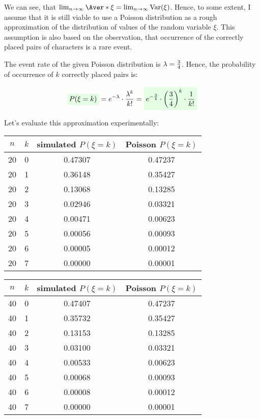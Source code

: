 \documentclass{article}
\newcommand{\highlight}[1]{\colorbox{green!10}{$\displaystyle#1$}}
\newcommand{\Var}{\mathrm{Var}}
\begin{document}
We can see, that $\lim_{n\to\infty} \Aver*{\xi} = \lim_{n\to\infty} \Var(\xi)$. Hence, to some extent, I assume that it is still viable to use a Poisson distribution as a rough approximation of the distribution of values of the random variable $\xi$. This assumption is also based on the observation, that occurrence of the correctly placed pairs of characters is a rare event.

The event rate of the given Poisson distribution is $\lambda = {3 \over 4}$. Hence, the probability of occurrence of $k$ correctly placed pairs is:

\begin{equation}
\highlight{P(\xi = k)} = e^{-\lambda} \cdot {\lambda^k \over k!} = \highlight{e^{-{3 \over 4}} \cdot \left({3 \over 4}\right)^k \cdot {1 \over k!}}
\end{equation}

Let's evaluate this approximation experimentally: \\

\begin{tabular}{| c | c | c | c |}
\hline
$n$ & $k$ & simulated $P(\xi = k)$ & Poisson $P(\xi = k)$ \\ \hline 
20 & 0 & 0.47307 & 0.47237 \\ \hline 
20 & 1 & 0.36148 & 0.35427 \\ \hline 
20 & 2 & 0.13068 & 0.13285 \\ \hline 
20 & 3 & 0.02946 & 0.03321 \\ \hline 
20 & 4 & 0.00471 & 0.00623 \\ \hline 
20 & 5 & 0.00056 & 0.00093 \\ \hline 
20 & 6 & 0.00005 & 0.00012 \\ \hline 
20 & 7 & 0.00000 & 0.00001 \\ \hline 
\end{tabular}
\quad
\begin{tabular}{| c | c | c | c |}
\hline
$n$ & $k$ & simulated $P(\xi = k)$ & Poisson $P(\xi = k)$ \\ \hline 
40 & 0 & 0.47407 & 0.47237 \\ \hline 
40 & 1 & 0.35732 & 0.35427 \\ \hline 
40 & 2 & 0.13153 & 0.13285 \\ \hline 
40 & 3 & 0.03100 & 0.03321 \\ \hline 
40 & 4 & 0.00533 & 0.00623 \\ \hline 
40 & 5 & 0.00068 & 0.00093 \\ \hline 
40 & 6 & 0.00008 & 0.00012 \\ \hline 
40 & 7 & 0.00000 & 0.00001 \\ \hline 
\end{tabular}
\end{document}

